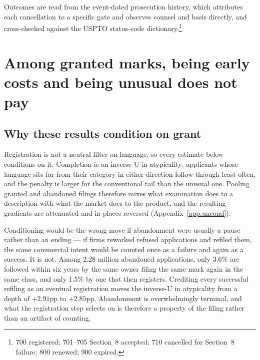 \documentclass[11pt]{article}
\begin{document}
Outcomes are read from the event-dated prosecution history, which attributes
each cancellation to a specific gate and observes counsel and basis directly,
and cross-checked against the USPTO status-code dictionary.\footnote{700
registered; 701--705 Section~8 accepted; 710 cancelled for Section~8 failure;
800 renewed; 900 expired.}



\section{Among granted marks, being early costs and being unusual does not pay}\label{sec:results}

\subsection{Why these results condition on grant}

Registration is not a neutral filter on language, so every estimate below
conditions on it. Completion is an inverse-U in atypicality: applicants whose
language sits far from their category in either direction follow through least
often, and the penalty is larger for the conventional tail than the unusual
one. Pooling granted and abandoned filings therefore mixes what examination
does to a description with what the market does to the product, and the
resulting gradients are attenuated and in places reversed
(Appendix~\ref{app:uncond}).

Conditioning would be the wrong move if abandonment were usually a pause
rather than an ending --- if firms reworked refused applications and refiled
them, the same commercial intent would be counted once as a failure and again
as a success. It is not. Among 2.28 million abandoned applications, only
3.6\% are followed within six years by the same owner filing the same mark
again in the same class, and only 1.5\% by one that then registers. Crediting
every successful refiling as an eventual registration moves the inverse-U in
atypicality from a depth of $+2.91$pp to $+2.85$pp. Abandonment is
overwhelmingly terminal, and what the registration step selects on is
therefore a property of the filing rather than an artifact of counting.
\end{document}
